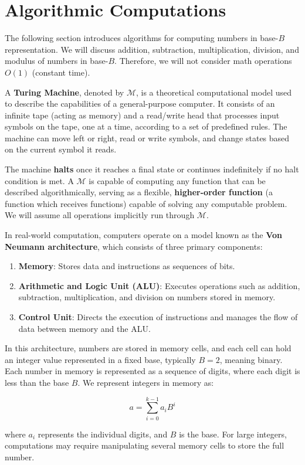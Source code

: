 \section{Algorithmic Computations}
    \noindent 
    The following section introduces algorithms for computing numbers in base-$B$ representation. We will discuss addition, subtraction, multiplication, division, and modulus of numbers in base-$B$.
    Therefore, we will not consider math operations $O(1)$ (constant time).\\
 

\begin{Def}

    A \textbf{Turing Machine}, denoted by \(\mathcal{M}\), is a theoretical computational model used to describe the capabilities of a general-purpose computer. It consists of an infinite tape (acting as memory) and a read/write head that processes input symbols on the tape, one at a time, according to a set of predefined rules. The machine can move left or right, read or write symbols, and change states based on the current symbol it reads. 
    
    The machine \textbf{halts} once it reaches a final state or continues indefinitely if no halt condition is met. A \(\mathcal{M}\) is capable of computing any function that can be described algorithmically, serving as a flexible, \textbf{higher-order function} (a function which receives functions) capable of solving any computable problem. We will assume all operations implicitly run through \(\mathcal{M}\).
\end{Def}

\begin{Def}

    In real-world computation, computers operate on a model known as the \textbf{Von Neumann architecture}, which consists of three primary components:
    \begin{enumerate}
        \item \textbf{Memory}: Stores data and instructions as sequences of bits.
        \item \textbf{Arithmetic and Logic Unit (ALU)}: Executes operations such as addition, subtraction, multiplication, and division on numbers stored in memory.
        \item \textbf{Control Unit}: Directs the execution of instructions and manages the flow of data between memory and the ALU.
    \end{enumerate}
    
    In this architecture, numbers are stored in memory cells, and each cell can hold an integer value represented in a fixed base, typically \(B = 2\), meaning binary. Each number in memory is represented as a sequence of digits, where each digit is less than the base \(B\). We represent integers in memory as:
    
    \[
    a = \sum_{i=0}^{k-1} a_i B^i
    \]
    
    where \( a_i \) represents the individual digits, and \(B\) is the base. For large integers, computations may require manipulating several memory cells to store the full number.
\end{Def}

